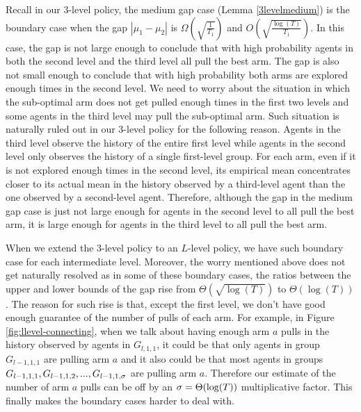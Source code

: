  Recall in our 3-level policy, the medium gap case (Lemma \ref{3levelmedium}) is the boundary case when the gap $|\mu_1-\mu_2|$ is $\Omega\left(\sqrt{\frac{1}{T_1}}\right)$ and $O\left(\sqrt{\frac{\log(T)}{T_1}}\right)$. In this case, the gap is not large enough to conclude that with high probability agents in both the second level and the third level all pull the best arm. The gap is also not small enough to conclude that with high probability both arms are explored enough times in the second level. We need to worry about the situation in which the sub-optimal arm does not get pulled enough times in the first two levels and some agents in the third level may pull the sub-optimal arm. Such situation is naturally ruled out in our 3-level policy for the following reason. Agents in the third level observe the history of the entire first level while agents in the second level only observes the history of a single first-level group. For each arm, even if it is not explored enough times in the second level, its empirical mean concentrates closer to its actual mean in the history observed by a third-level agent than the one observed by a second-level agent. Therefore, although the gap in the medium gap case is just not large enough for agents in the second level to all pull the best arm, it is large enough for agents in the third level to all pull the best arm.

When we extend the 3-level policy to an $L$-level policy, we have such boundary case for each intermediate level. Moreover, the worry mentioned above does not get naturally resolved as in some of these boundary cases, the ratios between the upper and lower bounds of the gap rise from $\Theta(\sqrt{\log(T)})$ to $\Theta(\log(T))$. The reason for such rise is that, except the first level, we don't have good enough guarantee of the number of pulls of each arm. For example, in Figure \ref{fig:llevel-connecting}, when we talk about having enough arm $a$ pulls in the history observed by agents in $G_{l,1,1}$, it could be that  only agents in group $G_{l-1,1,1}$ are pulling arm $a$ and it also could be that most agents in groups $G_{l-1,1,1},G_{l-1,1,2},...,G_{l-1,1,\sigma}$ are pulling arm $a$. Therefore our estimate of the number of arm $a$ pulls can be off by an $\sigma=\Theta(\log(T))$ multiplicative factor. This finally makes the boundary cases harder to deal with.

